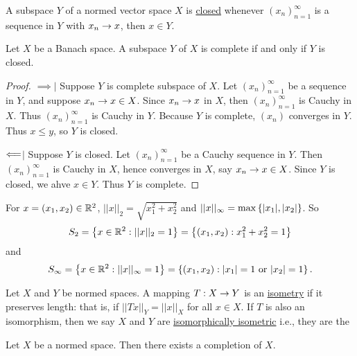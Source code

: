 \documentclass[]{article}
\begin{document}
\begin{definition}
	A subspace $Y$ of a normed vector space $X$ is \ul{closed} whenever $(x_n)_{n=1}^\infty$ is a sequence in $Y$ with $x_n\rightarrow x$, then $x\in Y$.
\end{definition}
\begin{theorem}
	Let $X$ be a Banach space.
	A subspace $Y$ of $X$ is complete if and only if $Y$ is closed.
\end{theorem}
\begin{proof}
	\ul{$\implies$}$|$ Suppose $Y$ is complete subspace of $X$. Let $(x_n)_{n=1}^\infty$ be a sequence in $Y$, and suppose $x_n\rightarrow x\in X$. Since $x_n\rightarrow x$ in $X$, then $(x_n)_{n=1}^\infty$ is Cauchy in $X$. Thus $(x_n)_{n=1}^\infty$ is Cauchy in $Y$.
	Because $Y$ is complete, $(x_n)$ converges in $Y$. Thus $x\leq y$, so $Y$ is closed.

	\ul{$\Longleftarrow$}$|$ Suppose $Y$ is closed. Let $(x_n)_{n=1}^\infty$ be a Cauchy sequence in $Y$. Then $(x_n)_{n=1}^\infty$ is Cauchy in $X$, hence converges in $X$, say $x_n\rightarrow x\in X$. Since $Y$ is closed, we ahve $x\in Y$.
	Thus $Y$ is complete.
\end{proof}

\begin{recall}
	For $x = (x_1,x_2)\in\mathbb{R}^2$, $||x||_2 = \sqrt{x_1^2+x_2^2}$ and $||x||_\infty = \max\left\{ |x_1|,|x_2| \right\}$.
	So $$S_2 = \left\{ x\in\mathbb{R}^2 : ||x||_2 = 1 \right\} = \left\{ (x_1,x_2) : x_1^2+x_2^2=1 \right\}$$ 
	and $$S_\infty = \left\{ x\in\mathbb{R}^2 : ||x||_\infty=1 \right\} = \left\{ (x_1,x_2) : |x_1|=1\text{ or }|x_2|=1 \right\}.$$
\end{recall}

\begin{definition}
	Let $X$ and $Y$ be normed spaces.
	A mapping $T:X\rightarrow Y$ is an \ul{isometry} if it preserves length: that is, if $||Tx||_Y = ||x||_X$ for all $x\in X$.
	If $T$ is also an isomorphism, then we say $X$ and $Y$ are \ul{isomorphically isometric} i.e., they are the 
\end{definition}

\begin{theorem}
	Let $X$ be a normed space.
	Then there exists a completion of $X$.
\end{theorem}
\end{document}
